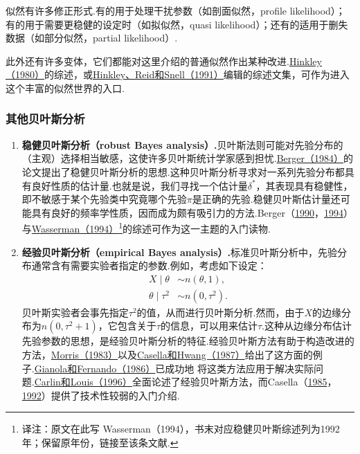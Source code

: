 似然有许多修正形式.有的用于处理干扰参数（如剖面似然，profile likelihood）；有的用于需要更稳健的设定时（如拟似然，quasi likelihood）；还有的适用于删失数据（如部分似然，partial likelihood）.

此外还有许多变体，它们都能对这里介绍的普通似然作出某种改进.\hyperref[bib:source166]{Hinkley（1980）}的综述，或\hyperref[bib:source167]{Hinkley、Reid和Snell（1991）}编辑的综述文集，可作为进入这个丰富的似然世界的入口.

\subsubsection{其他贝叶斯分析}\label{sec:7.5.6}
\begin{enumerate}[label=\arabic*.]
\item \textbf{稳健贝叶斯分析（robust Bayes analysis）.}贝叶斯法则可能对先验分布的（主观）选择相当敏感，这使许多贝叶斯统计学家感到担忧.\hyperref[bib:source17]{Berger（1984）}的论文提出了稳健贝叶斯分析的思想.这种贝叶斯分析寻求对一系列先验分布都具有良好性质的估计量.也就是说，我们寻找一个估计量$\delta^*$，其表现具有稳健性，即不敏感于某个先验类中究竟哪个先验$\pi$是正确的先验.稳健贝叶斯估计量还可能具有良好的频率学性质，因而成为颇有吸引力的方法.Berger（\hyperref[bib:source19]{1990}，\hyperref[bib:source20]{1994}）与\hyperref[bib:source327]{Wasserman（1994）}\footnote{译注：原文在此写 Wasserman（1994），书末对应稳健贝叶斯综述列为1992年；保留原年份，链接至该条文献.}的综述可作为这一主题的入门读物.
\item \textbf{经验贝叶斯分析（empirical Bayes analysis）.}标准贝叶斯分析中，先验分布通常含有需要实验者指定的参数.例如，考虑如下设定：
$$\begin{aligned}X\mid\theta&\sim n(\theta,1),\\\theta\mid\tau^2&\sim n(0,\tau^2).\end{aligned}$$
贝叶斯实验者会事先指定$\tau^2$的值，从而进行贝叶斯分析.然而，由于$X$的边缘分布为$n(0,\tau^2+1)$，它包含关于$\tau$的信息，可以用来估计$\tau$.这种从边缘分布估计先验参数的思想，是经验贝叶斯分析的特征.经验贝叶斯方法有助于构造改进的方法，\hyperref[bib:source225]{Morris（1983）}以及\hyperref[bib:source68]{Casella和Hwang（1987）}给出了这方面的例子.\hyperref[bib:source141]{Gianola和Fernando（1986）}已成功地
将这类方法应用于解决实际问题.\hyperref[bib:source57]{Carlin和Louis（1996）}全面论述了经验贝叶斯方法，而Casella（\hyperref[bib:source63]{1985}，\hyperref[bib:source65]{1992}）提供了技术性较弱的入门介绍.

\end{enumerate}
